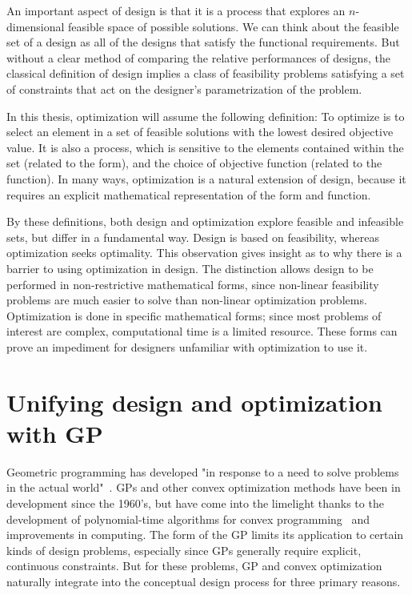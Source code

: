 An important aspect of design is that it is a process that explores an
$n$-dimensional feasible space of possible solutions.
We can think about the feasible set of a design as all of the designs
that satisfy the functional requirements. But without a clear method of comparing
the relative performances of designs, the classical
definition of design implies a class of feasibility problems satisfying a set of
constraints that act on the designer's parametrization of the problem.

In this thesis, optimization will assume the following definition: To optimize is to select an
element in a set of feasible solutions with the lowest desired objective
value. It is also a process, which is sensitive to the elements contained within the set
(related to the form), and the choice of objective function (related to the
function).
In many ways, optimization is a natural extension of design, because it requires
an explicit mathematical representation of the form and function.

By these definitions, both design and
optimization explore feasible and infeasible sets, but differ in a fundamental way.
Design is based on feasibility, whereas optimization seeks optimality.
This observation gives insight as to why there is a barrier
to using optimization in design.
The distinction allows design to be performed
in non-restrictive mathematical forms, since non-linear feasibility problems are
much easier to solve than non-linear optimization problems. Optimization is
done in specific mathematical forms; since most problems of interest are complex,
computational time is a limited resource. These forms can prove
an impediment for designers unfamiliar with optimization to use it.

\section{Unifying design and optimization with GP}

Geometric programming has developed "in response to a need to solve problems in the actual
world"~\cite{duffingp}. \gls{GP}s and other convex optimization methods have been
in development since the 1960's, but have come into the limelight thanks to the development of
polynomial-time algorithms for convex programming~\cite{interior_point} and
improvements in computing. The form of the \gls{GP} limits its application
to certain kinds of design
problems, especially since \gls{GP}s generally require explicit, continuous constraints.
But for these problems, \gls{GP} and convex
optimization naturally integrate into the conceptual design process
for three primary reasons.

